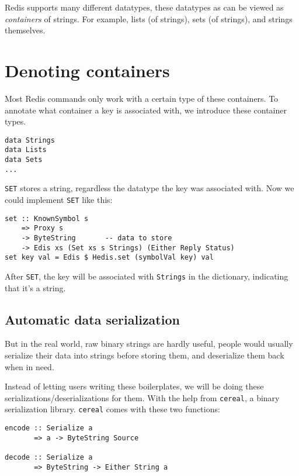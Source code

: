 \documentclass[pldi]{sigplanconf-pldi16}
\begin{document}
Redis supports many different datatypes, these datatypes as can be viewed as
\emph{containers} of strings. For example, lists (of strings),
sets (of strings), and strings themselves.

\section{Denoting containers}
Most Redis commands only work with a certain type of these containers. To
annotate what container a key is associated with, we introduce these container
types.

\begin{verbatim}
data Strings
data Lists
data Sets
...
\end{verbatim}

\texttt{SET} stores a string, regardless the datatype the key was
 associated with. Now we could implement \texttt{SET} like this:

\begin{verbatim}
set :: KnownSymbol s
    => Proxy s
    -> ByteString       -- data to store
    -> Edis xs (Set xs s Strings) (Either Reply Status)
set key val = Edis $ Hedis.set (symbolVal key) val
\end{verbatim}

After \texttt{SET}, the key will be associated with
\texttt{Strings} in the dictionary, indicating that it's a string.
%

\subsection{Automatic data serialization}
But in the real world, raw binary strings are hardly useful, people would
usually serialize their data into strings before storing them, and deserialize
them back when in need.

Instead of letting users writing these boilerplates, we will be doing these
serializations/deserializations for them. With the help from
\texttt{cereal}, a binary serialization library.
\texttt{cereal} comes with these two functions:

\begin{verbatim}
encode :: Serialize a
       => a -> ByteString Source

decode :: Serialize a
       => ByteString -> Either String a
\end{verbatim}
\end{document}
